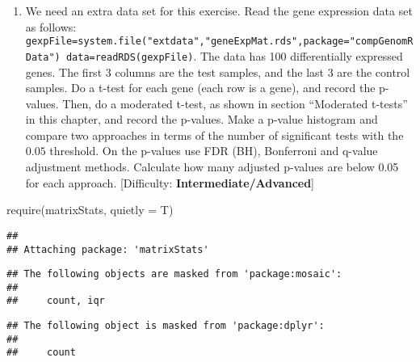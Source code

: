 \documentclass[
]{article}
\newenvironment{Shaded}{\begin{snugshade}}{\end{snugshade}}
\newcommand{\AttributeTok}[1]{\textcolor[rgb]{0.77,0.63,0.00}{#1}}
\newcommand{\FunctionTok}[1]{\textcolor[rgb]{0.00,0.00,0.00}{#1}}
\newcommand{\NormalTok}[1]{#1}
\providecommand{\tightlist}{%
  \setlength{\itemsep}{0pt}\setlength{\parskip}{0pt}}
\begin{document}
\begin{enumerate}
\def\labelenumi{\arabic{enumi}.}
\setcounter{enumi}{2}
\tightlist
\item
  We need an extra data set for this exercise. Read the gene expression
  data set as follows:
  \texttt{gexpFile=system.file("extdata","geneExpMat.rds",package="compGenomRData")\ data=readRDS(gexpFile)}.
  The data has 100 differentially expressed genes. The first 3 columns
  are the test samples, and the last 3 are the control samples. Do a
  t-test for each gene (each row is a gene), and record the p-values.
  Then, do a moderated t-test, as shown in section ``Moderated t-tests''
  in this chapter, and record the p-values. Make a p-value histogram and
  compare two approaches in terms of the number of significant tests
  with the \(0.05\) threshold. On the p-values use FDR (BH), Bonferroni
  and q-value adjustment methods. Calculate how many adjusted p-values
  are below 0.05 for each approach. {[}Difficulty:
  \textbf{Intermediate/Advanced}{]}
\end{enumerate}

\begin{Shaded}
\begin{Highlighting}[]
\FunctionTok{require}\NormalTok{(matrixStats, }\AttributeTok{quietly =}\NormalTok{ T)}
\end{Highlighting}
\end{Shaded}

\begin{verbatim}
## 
## Attaching package: 'matrixStats'
\end{verbatim}

\begin{verbatim}
## The following objects are masked from 'package:mosaic':
## 
##     count, iqr
\end{verbatim}

\begin{verbatim}
## The following object is masked from 'package:dplyr':
## 
##     count
\end{verbatim}
\end{document}
